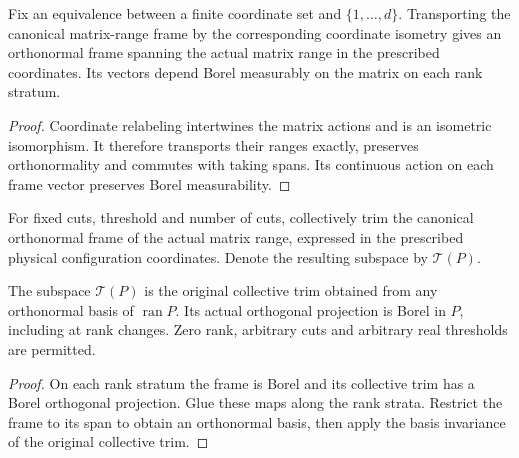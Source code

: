 \begin{lemma}
    \label{lem:borel_range_frame_prescribed_coordinates}
    \leanok
    Fix an equivalence between a finite coordinate set and
    $\{1,\ldots,d\}$. Transporting the canonical matrix-range frame by
    the corresponding coordinate isometry gives an orthonormal frame
    spanning the actual matrix range in the prescribed coordinates.
    Its vectors depend Borel measurably on the matrix on each rank stratum.
\end{lemma}
\begin{proof}\leanok
    Coordinate relabeling intertwines the matrix actions and is an
    isometric isomorphism. It therefore transports their ranges exactly,
    preserves orthonormality and commutes with taking spans. Its continuous
    action on each frame vector preserves Borel measurability.
\end{proof}

\begin{definition}
    \label{def:canonical_collective_trim_matrix_range}
    \leanok
    For fixed cuts, threshold and number of cuts, collectively trim the
    canonical orthonormal frame of the actual matrix range, expressed in
    the prescribed physical configuration coordinates. Denote the resulting
    subspace by $\mathcal T(P)$.
\end{definition}

\begin{lemma}
    \label{lem:borel_canonical_collective_trim_matrix_range}
    \leanok
    The subspace $\mathcal T(P)$ is the original collective trim obtained
    from any orthonormal basis of $\operatorname{ran}P$. Its actual
    orthogonal projection is Borel in $P$, including at rank changes.
    Zero rank, arbitrary cuts and arbitrary real thresholds are permitted.
\end{lemma}
\begin{proof}\leanok
    On each rank stratum the frame is Borel and its collective trim has
    a Borel orthogonal projection. Glue these maps along the rank strata.
    Restrict the frame to its span to obtain an orthonormal basis, then
    apply the basis invariance of the original collective trim.
\end{proof}

